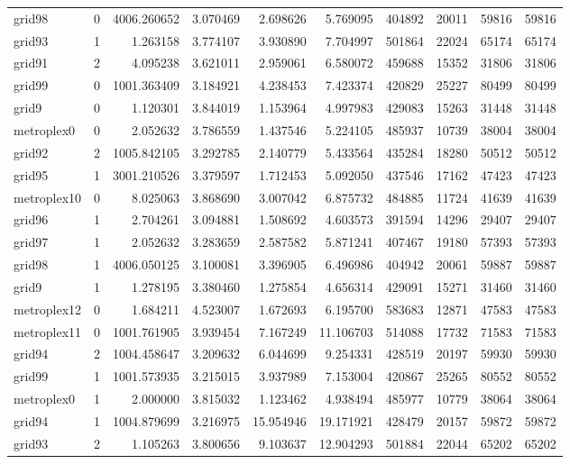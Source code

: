 \begin{longtable}{|l|r|r|r|r|r|r|r|r|r|}
grid98 & 0 & 4006.260652 & 3.070469 & 2.698626 & 5.769095 & 404892 & 20011 & 59816 & 59816 \\
grid93 & 1 & 1.263158 & 3.774107 & 3.930890 & 7.704997 & 501864 & 22024 & 65174 & 65174 \\
grid91 & 2 & 4.095238 & 3.621011 & 2.959061 & 6.580072 & 459688 & 15352 & 31806 & 31806 \\
grid99 & 0 & 1001.363409 & 3.184921 & 4.238453 & 7.423374 & 420829 & 25227 & 80499 & 80499 \\
grid9 & 0 & 1.120301 & 3.844019 & 1.153964 & 4.997983 & 429083 & 15263 & 31448 & 31448 \\
metroplex0 & 0 & 2.052632 & 3.786559 & 1.437546 & 5.224105 & 485937 & 10739 & 38004 & 38004 \\
grid92 & 2 & 1005.842105 & 3.292785 & 2.140779 & 5.433564 & 435284 & 18280 & 50512 & 50512 \\
grid95 & 1 & 3001.210526 & 3.379597 & 1.712453 & 5.092050 & 437546 & 17162 & 47423 & 47423 \\
metroplex10 & 0 & 8.025063 & 3.868690 & 3.007042 & 6.875732 & 484885 & 11724 & 41639 & 41639 \\
grid96 & 1 & 2.704261 & 3.094881 & 1.508692 & 4.603573 & 391594 & 14296 & 29407 & 29407 \\
grid97 & 1 & 2.052632 & 3.283659 & 2.587582 & 5.871241 & 407467 & 19180 & 57393 & 57393 \\
grid98 & 1 & 4006.050125 & 3.100081 & 3.396905 & 6.496986 & 404942 & 20061 & 59887 & 59887 \\
grid9 & 1 & 1.278195 & 3.380460 & 1.275854 & 4.656314 & 429091 & 15271 & 31460 & 31460 \\
metroplex12 & 0 & 1.684211 & 4.523007 & 1.672693 & 6.195700 & 583683 & 12871 & 47583 & 47583 \\
metroplex11 & 0 & 1001.761905 & 3.939454 & 7.167249 & 11.106703 & 514088 & 17732 & 71583 & 71583 \\
grid94 & 2 & 1004.458647 & 3.209632 & 6.044699 & 9.254331 & 428519 & 20197 & 59930 & 59930 \\
grid99 & 1 & 1001.573935 & 3.215015 & 3.937989 & 7.153004 & 420867 & 25265 & 80552 & 80552 \\
metroplex0 & 1 & 2.000000 & 3.815032 & 1.123462 & 4.938494 & 485977 & 10779 & 38064 & 38064 \\
grid94 & 1 & 1004.879699 & 3.216975 & 15.954946 & 19.171921 & 428479 & 20157 & 59872 & 59872 \\
grid93 & 2 & 1.105263 & 3.800656 & 9.103637 & 12.904293 & 501884 & 22044 & 65202 & 65202 \\

\end{longtable}
